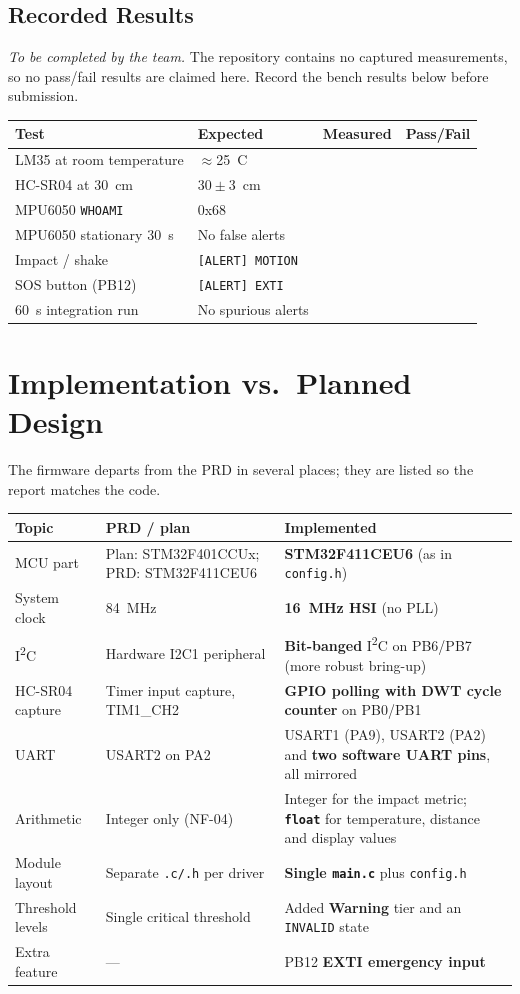 \documentclass[11pt,a4paper]{article}
\newcommand{\degC}{\textdegree{}C}
\newcommand{\ttu}{\textunderscore}
\begin{document}
\subsection{Recorded Results}
\textit{To be completed by the team.} The repository contains no captured measurements, so no pass/fail results are claimed here. Record the bench results below before submission.

\begin{tabularx}{\textwidth}{@{}L{5cm} L{3.6cm} X L{1.8cm}@{}}
\toprule
\textbf{Test} & \textbf{Expected} & \textbf{Measured} & \textbf{Pass/Fail}\\
\midrule
LM35 at room temperature & $\approx$25~\degC & & \\
HC-SR04 at 30~cm & $30\pm 3$~cm & & \\
MPU6050 \texttt{WHO\ttu AM\ttu I} & 0x68 & & \\
MPU6050 stationary 30~s & No false alerts & & \\
Impact / shake & \texttt{[ALERT] MOTION} & & \\
SOS button (PB12) & \texttt{[ALERT] EXTI} & & \\
60~s integration run & No spurious alerts & & \\
\bottomrule
\end{tabularx}

\section{Implementation vs.\ Planned Design}
The firmware departs from the PRD in several places; they are listed so the report matches the code.

\begin{tabularx}{\textwidth}{@{}L{2.8cm} L{4.6cm} X@{}}
\toprule
\textbf{Topic} & \textbf{PRD / plan} & \textbf{Implemented}\\
\midrule
MCU part & Plan: STM32F401CCUx; PRD: STM32F411CEU6 & \textbf{STM32F411CEU6} (as in \texttt{config.h})\\
System clock & 84~MHz & \textbf{16~MHz HSI} (no PLL)\\
I\textsuperscript{2}C & Hardware I2C1 peripheral & \textbf{Bit-banged} I\textsuperscript{2}C on PB6/PB7 (more robust bring-up)\\
HC-SR04 capture & Timer input capture, TIM1\_CH2 & \textbf{GPIO polling with DWT cycle counter} on PB0/PB1\\
UART & USART2 on PA2 & USART1 (PA9), USART2 (PA2) and \textbf{two software UART pins}, all mirrored\\
Arithmetic & Integer only (NF-04) & Integer for the impact metric; \textbf{\texttt{float}} for temperature, distance and display values\\
Module layout & Separate \texttt{.c/.h} per driver & \textbf{Single \texttt{main.c}} plus \texttt{config.h}\\
Threshold levels & Single critical threshold & Added \textbf{Warning} tier and an \texttt{INVALID} state\\
Extra feature & --- & PB12 \textbf{EXTI emergency input}\\
\bottomrule
\end{tabularx}
\end{document}
